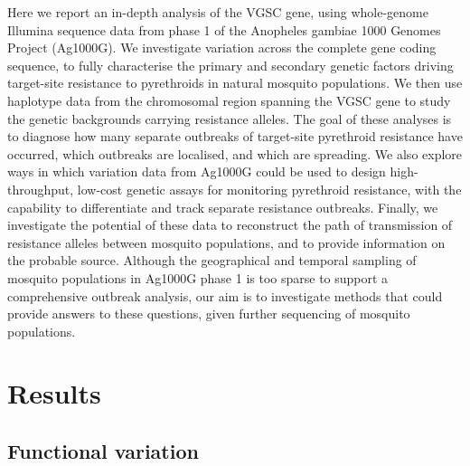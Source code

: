 \documentclass[a4paper,11pt,abstracton,hidelinks]{scrartcl}
\begin{document}
Here we report an in-depth analysis of the VGSC gene, using whole-genome Illumina sequence data from phase 1 of the Anopheles gambiae 1000 Genomes Project (Ag1000G).
%
We investigate variation across the complete gene coding sequence, to fully characterise the primary and secondary genetic factors driving target-site resistance to pyrethroids in natural mosquito populations.
%
We then use haplotype data from the chromosomal region spanning the VGSC gene to study the genetic backgrounds carrying resistance alleles.
%
The goal of these analyses is to diagnose how many separate outbreaks of target-site pyrethroid resistance have occurred, which outbreaks are localised, and which are spreading.
%
We also explore ways in which variation data from Ag1000G could be used to design high-throughput, low-cost genetic assays for monitoring pyrethroid resistance, with the capability to differentiate and track separate resistance outbreaks.
%
Finally, we investigate the potential of these data to reconstruct the path of transmission of resistance alleles between mosquito populations, and to provide information on the probable source.
%
Although the geographical and temporal sampling of mosquito populations in Ag1000G phase 1 is too sparse to support a comprehensive outbreak analysis, our aim is to investigate methods that could provide answers to these questions, given further sequencing of mosquito populations.  
%




\section*{Results}


\subsection*{Functional variation}
\end{document}
